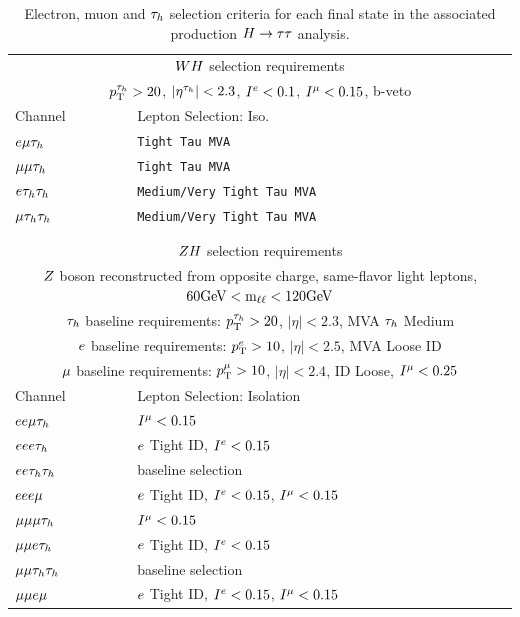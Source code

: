 \begin{table}[htbp]
\centering
\begin{small}
\begin{tabular}{ll}
     \multicolumn{2}{c}{$WH$ selection requirements}                 \\ 
     \multicolumn{2}{c}{$p_\mathrm{T}^{\tau_{h}}>20$, $|\eta^{\tau_{h}}|<2.3$, $I^{e}<0.1$, $I^{\mu}<0.15$, b-veto }                 \\ 
\hline
  Channel           &       Lepton Selection: Iso.  \\
\hline
 $e\mu\tau_{h}$      &  \texttt{Tight Tau MVA}  \\
 $\mu\mu\tau_{h}$     &  \texttt{Tight Tau MVA}  \\
 $e\tau_{h}\tau_{h}$     &  \texttt{Medium/Very Tight Tau MVA} \\
 $\mu\tau_{h}\tau_{h}$    &  \texttt{Medium/Very Tight Tau MVA} \\
\hline \\

\\
     \multicolumn{2}{c}{$ZH$ selection requirements}                 \\ 
     \multicolumn{2}{c}{$Z$ boson reconstructed from opposite charge, same-flavor light leptons, $60\mathrm{GeV} < \textrm{m}_{\ell\ell} < 120\mathrm{GeV}$}  \\ 
     \multicolumn{2}{c}{$\tau_{h}$ baseline requirements: $p_\mathrm{T}^{\tau_{h}}>20$, $|\eta|<2.3$, MVA $\tau_{h}$ Medium}   \\ 
     \multicolumn{2}{c}{$e$ baseline requirements: $p_\mathrm{T}^{e}>10$, $|\eta|<2.5$, MVA Loose ID }   \\ 
     \multicolumn{2}{c}{$\mu$ baseline requirements: $p_\mathrm{T}^{\mu}>10$, $|\eta|<2.4$, ID Loose, $I^{\mu}<0.25$ }   \\ 
\hline
  Channel           &          Lepton Selection: Isolation  \\
\hline
  $ee\mu\tau_{h}$     &   $I^{\mu}<0.15$       \\
  $eee\tau_{h}$      &   $e$ Tight ID, $I^{e}<0.15$ \\
  $ee\tau_{h}\tau_{h}$    &   baseline selection       \\
  $eee\mu$       &   $e$ Tight ID, $I^{e}<0.15$, $I^{\mu}<0.15$ \\
\hline
  $\mu\mu\mu\tau_{h}$   &   $I^{\mu}<0.15$       \\
  $\mu\mu e\tau_{h}$    &   $e$ Tight ID, $I^{e}<0.15$ \\
  $\mu\mu\tau_{h}\tau_{h}$  &   baseline selection       \\
  $\mu\mu e\mu$     &   $e$ Tight ID, $I^{e}<0.15$, $I^{\mu}<0.15$ \\
\hline
\end{tabular}
\end{small}
\caption{
Electron, muon and $\tau_{h}$ selection criteria for each final state in the
associated production $H\to\tau\tau$ analysis.
}
\label{tab:vh_inclusive_selection}
\end{table}



